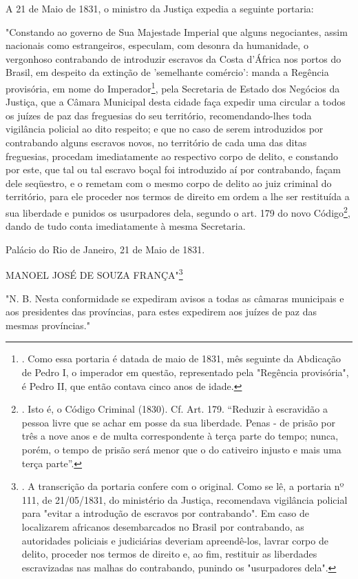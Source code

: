 A 21 de Maio de 1831, o ministro da Justiça expedia a seguinte portaria:

"Constando ao governo de Sua Majestade Imperial que alguns negociantes,
assim nacionais como estrangeiros, especulam, com desonra da humanidade,
o vergonhoso contrabando de introduzir escravos da Costa d'África nos
portos do Brasil, em despeito da extinção de 'semelhante comércio':
manda a Regência provisória, em nome do Imperador\footnote{. Como essa
  portaria é datada de maio de 1831, mês seguinte da Abdicação de Pedro
  I, o imperador em questão, representado pela "Regência provisória", é
  Pedro II, que então contava cinco anos de idade.}, pela Secretaria de
Estado dos Negócios da Justiça, que a Câmara Municipal desta cidade faça
expedir uma circular a todos os juízes de paz das freguesias do seu
território, recomendando-lhes toda vigilância policial ao dito respeito;
e que no caso de serem introduzidos por contrabando alguns escravos
novos, no território de cada uma das ditas freguesias, procedam
imediatamente ao respectivo corpo de delito, e constando por este, que
tal ou tal escravo boçal foi introduzido aí por contrabando, façam dele
seqüestro, e o remetam com o mesmo corpo de delito ao juiz criminal do
território, para ele proceder nos termos de direito em ordem a lhe ser
restituída a sua liberdade e punidos os usurpadores dela, segundo o art.
179 do novo Código\footnote{. Isto é, o Código Criminal (1830). Cf. Art.
  179. ``Reduzir à escravidão a pessoa livre que se achar em posse da
  sua liberdade. Penas - de prisão por três a nove anos e de multa
  correspondente à terça parte do tempo; nunca, porém, o tempo de prisão
  será menor que o do cativeiro injusto e mais uma terça parte''.},
dando de tudo conta imediatamente à mesma Secretaria.

Palácio do Rio de Janeiro, 21 de Maio de 1831.

MANOEL JOSÉ DE SOUZA FRANÇA"\footnote{. A transcrição da portaria
  confere com o original. Como se lê, a portaria nº 111, de 21/05/1831,
  do ministério da Justiça, recomendava vigilância policial para "evitar
  a introdução de escravos por contrabando". Em caso de localizarem
  africanos desembarcados no Brasil por contrabando, as autoridades
  policiais e judiciárias deveriam apreendê-los, lavrar corpo de delito,
  proceder nos termos de direito e, ao fim, restituir as liberdades
  escravizadas nas malhas do contrabando, punindo os "usurpadores dela".}

"N. B. Nesta conformidade se expediram avisos a todas as câmaras
municipais e aos presidentes das províncias, para estes expedirem aos
juízes de paz das mesmas províncias."

